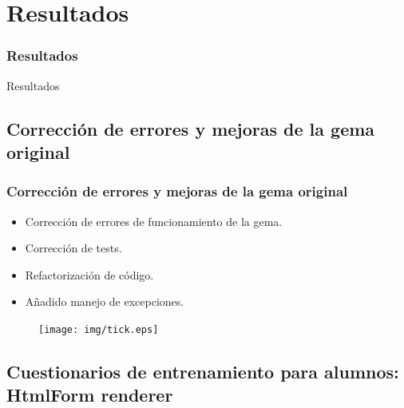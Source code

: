 \documentclass{beamer}
\begin{document}

\section{Resultados}
\begin{frame}
\frametitle{Resultados}
  
  \begin{center}
    \Huge{Resultados}
  \end{center}
\end{frame}

\subsection{Corrección de errores y mejoras de la gema original}
\begin{frame}
\frametitle{Corrección de errores y mejoras de la gema original}
  \bigskip
  \bigskip
  
  \begin{itemize}
    \item Corrección de errores de funcionamiento de la gema.
    \item Corrección de tests.
    \item Refactorización de código.
    \item Añadido manejo de excepciones.
  \end{itemize}
  
  \begin{figure}
    \hfill\texttt{[image: img/tick.eps]}
  \end{figure}
  
\end{frame}
  
\subsection{Cuestionarios de entrenamiento para alumnos: HtmlForm renderer}
  
\end{document}
